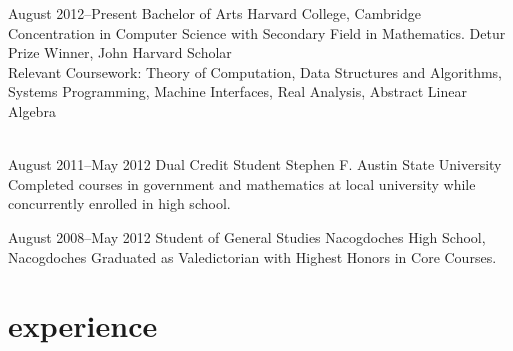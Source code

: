 \documentclass[]{friggeri-cv} %
\begin{document}
\entry
{August 2012--Present}
{Bachelor {\normalfont of Arts}}
{Harvard College, Cambridge}
{Concentration in Computer Science with Secondary Field in Mathematics. Detur Prize Winner, John Harvard Scholar\\
Relevant Coursework: Theory of Computation, Data Structures and Algorithms, Systems Programming, Machine Interfaces, Real Analysis, Abstract Linear Algebra \\
\\
}

\begin{detailed}
\entry
{August 2011--May 2012}
{Dual {\normalfont Credit Student}}
{Stephen F. Austin State University}
{Completed courses in government and mathematics at local university while concurrently enrolled in high school.\\
}
\end{detailed}

\entry
{August 2008--May 2012}
{Student {\normalfont of General Studies}}
{Nacogdoches High School, Nacogdoches}
{Graduated as Valedictorian with Highest Honors in Core Courses.\\
}
\begin{detailed}
\end{detailed}


\section{experience}
\end{document}
